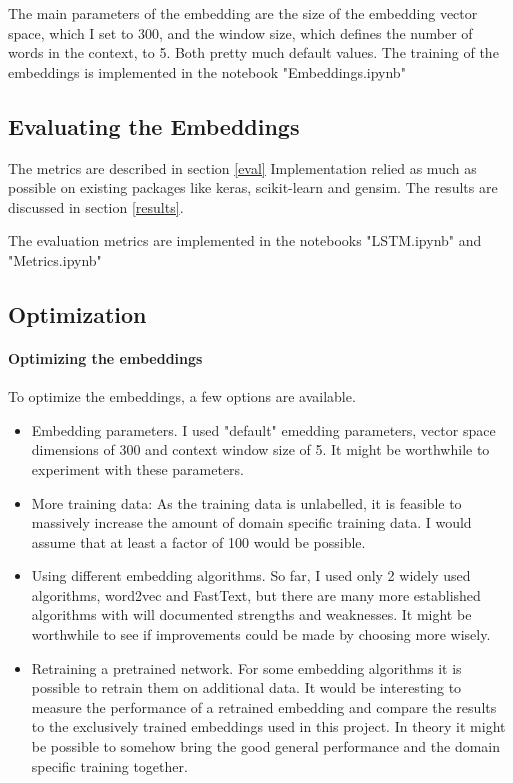 \documentclass[10pt,a4paper]{article}
\begin{document}
	The main parameters of the embedding are the size of the embedding vector space, which I set to 300, and the window size, which defines the number of words in the context, to 5. Both pretty much default values.
	The training of the embeddings is implemented in the notebook "Embeddings.ipynb"
	
	
	\subsection{Evaluating the Embeddings}
	
	The metrics are described in section \ref{eval} Implementation relied as much as possible on existing packages like keras, scikit-learn and gensim. The results are discussed in section \ref{results}.
	
	
	The evaluation metrics are implemented in the notebooks "LSTM.ipynb" and "Metrics.ipynb"
	
	
	
	\subsection{Optimization}
	
	\paragraph{Optimizing the embeddings}
	To optimize the embeddings, a few options are available.
	\begin{itemize}
		\item Embedding parameters. I used "default" emedding parameters, vector space dimensions of 300 and context window size of 5. It might be worthwhile to experiment with these parameters.
		\item More training data: As the training data is unlabelled, it is feasible to massively increase the amount of domain specific training data. I would assume that at least a factor of 100 would be possible.
		\item Using different embedding algorithms. So far, I used only 2 widely used algorithms, word2vec and FastText, but there are many more established algorithms with will documented strengths and weaknesses. It might be worthwhile to see if improvements could be made by choosing more wisely.
		\item Retraining a pretrained network. For some embedding algorithms it is possible to retrain them on additional data. It would be interesting to measure the performance of a retrained embedding and compare the results to the exclusively trained embeddings used in this project. In theory it might be possible to somehow bring the good general performance and the domain specific training together.
	\end{itemize}
	
\end{document}
